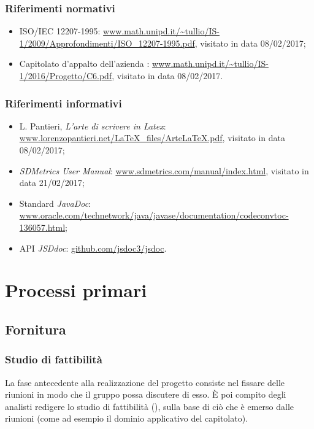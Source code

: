 \subsubsection{Riferimenti normativi}
\begin{itemize}
	\item ISO/IEC 12207-1995: \url{www.math.unipd.it/\~tullio/IS-1/2009/Approfondimenti/ISO_12207-1995.pdf}, visitato in data 08/02/2017;
	\item Capitolato d'appalto dell'azienda \ZU: \url{www.math.unipd.it/~tullio/IS-1/2016/Progetto/C6.pdf}, visitato in data 08/02/2017. %
\end{itemize}

\subsubsection{Riferimenti informativi}
\begin{itemize}
	\item L. Pantieri, \emph{L'arte di scrivere in Latex}: \url{www.lorenzopantieri.net/LaTeX_files/ArteLaTeX.pdf}, visitato in data 08/02/2017;
	\item \emph{SDMetrics User Manual}: \url{www.sdmetrics.com/manual/index.html}, visitato in data 21/02/2017;
	\item Standard \emph{JavaDoc}: \url{www.oracle.com/technetwork/java/javase/documentation/codeconvtoc-136057.html};
	\item API \emph{JSDdoc}: \url{github.com/jsdoc3/jsdoc}.
\end{itemize}





\section{Processi primari} \label{sec:primari}

\subsection{Fornitura}

	\subsubsection{Studio di fattibilità}
	La fase antecedente alla realizzazione del progetto consiste nel fissare delle riunioni in modo che il gruppo possa discutere di esso. È poi compito degli analisti redigere lo studio di fattibilità (\SdF), sulla base di ciò che è emerso dalle riunioni (come ad esempio il dominio applicativo del capitolato).

